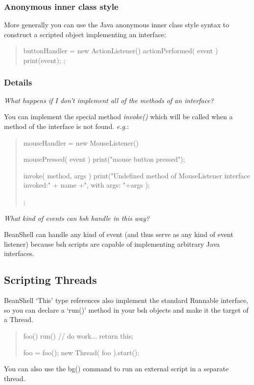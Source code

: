 \documentclass[twoside,11pt,nolof]{starlink}
\providecommand{\eg}{\textit{e.g.}}
\begin{document}
\subsubsection{Anonymous inner class style}
More generally you can use the Java anonymous inner class style syntax
to construct a scripted object implementing an interface:
\begin{quote}
\begin{terminalv}
    buttonHandler = new ActionListener() {
        actionPerformed( event ) {
            print(event);
        }
    };
\end{terminalv}
\end{quote}

\subsubsection{Details}
\textit{What happens if I don't implement all of the methods of an
interface?}

You can implement the special method \textit{invoke()} which will be
called when a method of the interface is not found. \eg:
\begin{quote}
\begin{terminalv}
    mouseHandler = new MouseListener() {
        mousePressed( event ) {
            print("mouse button pressed");
        }

        invoke( method, args ) {
            print("Undefined method of MouseListener interface invoked:"
                + name +", with args: "+args
            );
        }
    };
\end{terminalv}
\end{quote}

\textit{What kind of events can bsh handle in this way?}

BeanShell can handle any kind of event (and thus serve as any kind of
event listener) because bsh scripts are capable of implementing
arbitrary Java interfaces.

\subsection{Scripting Threads}

BeanShell `This' type references also implement the standard
Runnable interface, so you can declare a `run()' method in
your bsh objects and make it the target of a Thread.
\begin{quote}
\begin{terminalv}
    foo() {
        run() {
            // do work...
        }
        return this;
    }

    foo = foo();
    new Thread( foo ).start();
\end{terminalv}
\end{quote}
You can also use the bg() command to run an external script in a separate
thread.
\end{document}
